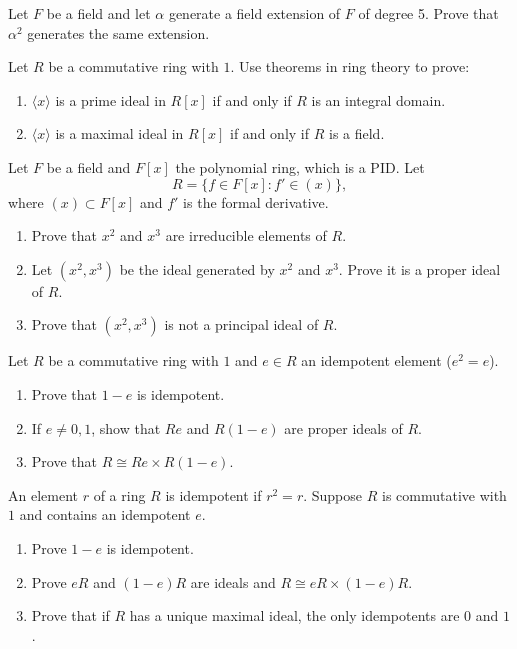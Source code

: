 \documentclass[11pt,twoside,openany]{memoir}
\begin{document}
    \begin{exercise}
    Let $F$ be a field and let $\alpha$ generate a field extension of $F$ of degree 5. Prove that $\alpha^2$ generates the same extension.
    \end{exercise}
    
    \begin{exercise}
    Let $R$ be a commutative ring with $1$. Use theorems in ring theory to prove:
    \begin{enumerate}[label=(\alph*)]
        \item $\langle x\rangle$ is a prime ideal in $R[x]$ if and only if $R$ is an integral domain.
        \item $\langle x\rangle$ is a maximal ideal in $R[x]$ if and only if $R$ is a field.
    \end{enumerate}
    \end{exercise}
    
    \begin{exercise}
    Let $F$ be a field and $F[x]$ the polynomial ring, which is a PID. Let
    \[
    R=\{f\in F[x]: f'\in (x)\},
    \]
    where $(x)\subset F[x]$ and $f'$ is the formal derivative.
    \begin{enumerate}[label=(\alph*)]
        \item Prove that $x^2$ and $x^3$ are irreducible elements of $R$.
        \item Let $(x^2,x^3)$ be the ideal generated by $x^2$ and $x^3$. Prove it is a proper ideal of $R$.
        \item Prove that $(x^2,x^3)$ is not a principal ideal of $R$.
    \end{enumerate}
    \end{exercise}
    
    \begin{exercise}
    Let $R$ be a commutative ring with $1$ and $e\in R$ an idempotent element ($e^2=e$).
    \begin{enumerate}[label=(\alph*)]
        \item Prove that $1-e$ is idempotent.
        \item If $e\neq 0,1$, show that $Re$ and $R(1-e)$ are proper ideals of $R$.
        \item Prove that $R\cong Re\times R(1-e)$.
    \end{enumerate}
    \end{exercise}
    
    \begin{exercise}
    An element $r$ of a ring $R$ is idempotent if $r^2=r$. Suppose $R$ is commutative with $1$ and contains an idempotent $e$.
    \begin{enumerate}[label=(\alph*)]
        \item Prove $1-e$ is idempotent.
        \item Prove $eR$ and $(1-e)R$ are ideals and $R\cong eR\times (1-e)R$.
        \item Prove that if $R$ has a unique maximal ideal, the only idempotents are $0$ and $1$.
    \end{enumerate}
    \end{exercise}
    
\end{document}
